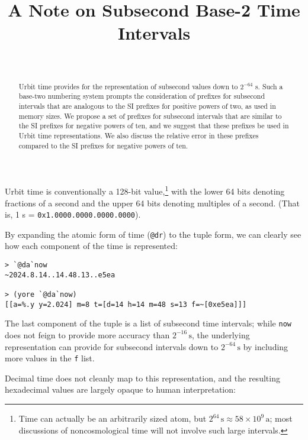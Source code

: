 \documentclass[twoside]{article}
\title{A Note on Subsecond Base-2 Time Intervals}
\author{\authorname~\authorpatp \\ \affiliation}
\date{}
\begin{document}
\maketitle
\thispagestyle{firststyle}

\begin{abstract}
Urbit time provides for the representation of subsecond values down to $2^{-64}$ s.  Such a base-two numbering system prompts the consideration of prefixes for subsecond intervals that are analogous to the SI prefixes for positive powers of two, as used in memory sizes.  We propose a set of prefixes for subsecond intervals that are similar to the SI prefixes for negative powers of ten, and we suggest that these prefixes be used in Urbit time representations.  We also discuss the relative error in these prefixes compared to the SI prefixes for negative powers of ten.
\end{abstract}

\setcounter{page}{1}

Urbit time is conventionally a 128-bit value,\footnote{Time can actually be an arbitrarily sized atom, but $2^{64} \,\textrm{s} \approx 58 \times 10^{9} \,\textrm{a}$; most discussions of noncosmological time will not involve such large intervals.} with the lower 64 bits denoting fractions of a second and the upper 64 bits denoting multiples of a second.  (That is, 1 s = \lstinline[style=inlinecode]{0x1.0000.0000.0000.0000}).

By expanding the atomic form of time (\lstinline[style=inlinecode]{@dr}) to the tuple form, we can clearly see how each component of the time is represented:

\begin{lstlisting}[style=listingcode]
> `@da`now
~2024.8.14..14.48.13..e5ea

> (yore `@da`now)
[[a=%.y y=2.024] m=8 t=[d=14 h=14 m=48 s=13 f=~[0xe5ea]]]
\end{lstlisting}

The last component of the tuple is a list of subsecond time intervals; while \lstinline[style=inlinecode]{now} does not feign to provide more accuracy than $2^{-16} \,\textrm{s}$, the underlying representation can provide for subsecond intervals down to $2^{-64} \,\textrm{s}$ by including more values in the \texttt{f} list.

Decimal time does not cleanly map to this representation, and the resulting hexadecimal values are largely opaque to human interpretation:
\end{document}
